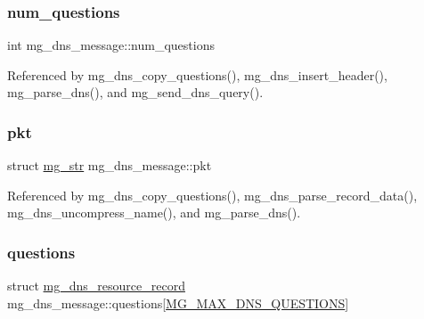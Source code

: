 \mbox{\label{structmg__dns__message_a035ced22ef43b6b23ad6df3ad3aad126_a035ced22ef43b6b23ad6df3ad3aad126}} 
\subsubsection{\texorpdfstring{num\+\_\+questions}{num\_questions}}
{\footnotesize\ttfamily int mg\+\_\+dns\+\_\+message\+::num\+\_\+questions}



Referenced by mg\+\_\+dns\+\_\+copy\+\_\+questions(), mg\+\_\+dns\+\_\+insert\+\_\+header(), mg\+\_\+parse\+\_\+dns(), and mg\+\_\+send\+\_\+dns\+\_\+query().

\mbox{\label{structmg__dns__message_ae8543b2a3044c785b4bf0dc4fc39beff_ae8543b2a3044c785b4bf0dc4fc39beff}} 
\subsubsection{\texorpdfstring{pkt}{pkt}}
{\footnotesize\ttfamily struct \hyperlink{structmg__str}{mg\+\_\+str} mg\+\_\+dns\+\_\+message\+::pkt}



Referenced by mg\+\_\+dns\+\_\+copy\+\_\+questions(), mg\+\_\+dns\+\_\+parse\+\_\+record\+\_\+data(), mg\+\_\+dns\+\_\+uncompress\+\_\+name(), and mg\+\_\+parse\+\_\+dns().

\mbox{\label{structmg__dns__message_a866a83825f2daa4043aa20acded4f007_a866a83825f2daa4043aa20acded4f007}} 
\subsubsection{\texorpdfstring{questions}{questions}}
{\footnotesize\ttfamily struct \hyperlink{structmg__dns__resource__record}{mg\+\_\+dns\+\_\+resource\+\_\+record} mg\+\_\+dns\+\_\+message\+::questions\mbox{[}\hyperlink{mongoose_8h_a84f36ff9caf50e0d70d10244a2c64b45_a84f36ff9caf50e0d70d10244a2c64b45}{M\+G\+\_\+\+M\+A\+X\+\_\+\+D\+N\+S\+\_\+\+Q\+U\+E\+S\+T\+I\+O\+NS}\mbox{]}}



